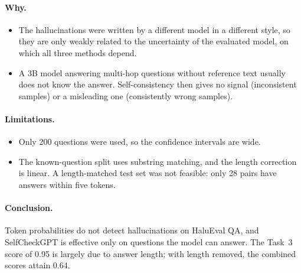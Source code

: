 \documentclass[11pt,a4paper]{article}
\begin{document}
\paragraph{Why.}
\begin{itemize}
  \item The hallucinations were written by a different model in a different style, so they are only
        weakly related to the uncertainty of the evaluated model, on which all three methods depend.
  \item A 3B model answering multi-hop questions without reference text usually does not know the
        answer. Self-consistency then gives no signal (inconsistent samples) or a misleading one
        (consistently wrong samples).
\end{itemize}

\paragraph{Limitations.}
\begin{itemize}
  \item Only 200 questions were used, so the confidence intervals are wide.
  \item The known-question split uses substring matching, and the length correction is linear. A
        length-matched test set was not feasible: only 28 pairs have answers within five tokens.
\end{itemize}

\paragraph{Conclusion.} Token probabilities do not detect hallucinations on HaluEval QA, and
SelfCheckGPT is effective only on questions the model can answer. The Task~3 score of 0.95 is
largely due to answer length; with length removed, the combined scores attain 0.64.
\end{document}
